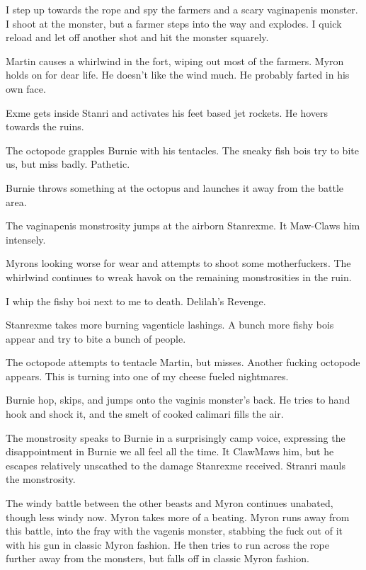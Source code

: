 I step up towards the rope and spy the farmers and a scary vaginapenis monster. I shoot at the monster, but a farmer steps into the way and explodes. I quick reload and let off another shot and hit the monster squarely.\medskip

Martin causes a whirlwind in the fort, wiping out most of the farmers. Myron holds on for dear life. He doesn’t like the wind much. He probably farted in his own face.\medskip

Exme gets inside Stanri and activates his feet based jet rockets. He hovers towards the ruins.\medskip

The octopode grapples Burnie with his tentacles. The sneaky fish bois try to bite us, but miss badly. Pathetic.\medskip

Burnie throws something at the octopus and launches it away from the battle area.\medskip

The vaginapenis monstrosity jumps at the airborn Stanrexme. It Maw-Claws him intensely.\medskip

Myrons looking worse for wear and attempts to shoot some motherfuckers. The whirlwind continues to wreak havok on the remaining monstrosities in the ruin.\medskip

I whip the fishy boi next to me to death. Delilah’s Revenge.\medskip

Stanrexme takes more burning vagenticle lashings. A bunch more fishy bois appear and try to bite a bunch of people.\medskip

The octopode attempts to tentacle Martin, but misses. Another fucking octopode appears. This is turning into one of my cheese fueled nightmares.\medskip

Burnie hop, skips, and jumps onto the vaginis monster’s back. He tries to hand hook and shock it, and the smelt of cooked calimari fills the air.\medskip

The monstrosity speaks to Burnie in a surprisingly camp voice, expressing the disappointment in Burnie we all feel all the time. It ClawMaws him, but he escapes relatively unscathed to the damage Stanrexme received. Stranri mauls the monstrosity.\medskip

The windy battle between the other beasts and Myron continues unabated, though less windy now. Myron takes more of a beating. Myron runs away from this battle, into the fray with the vagenis monster, stabbing the fuck out of it with his gun in classic Myron fashion. He then tries to run across the rope further away from the monsters, but falls off in classic Myron fashion.\medskip

